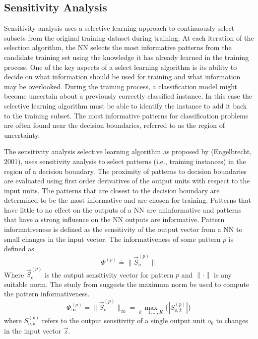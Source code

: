 \documentclass[conference]{IEEEtran}
\begin{document}
	\subsection{Sensitivity Analysis}
	Sensitivity analysis uses a selective learning approach to continuously select subsets from the original training dataset during training. At each iteration of the selection algorithm, the NN selects the most informative patterns from the candidate training set using the knowledge it has already learned in the training process. One of the key aspects of a select learning algorithm is its ability to decide on what information should be used for training and what information may be overlooked. During the training process, a classification model might become uncertain about a previously correctly classified instance. In this case the selective learning algorithm must be able to identify the instance to add it back to the training subset. The most informative patterns for classification problems are often found near the decision boundaries, referred to as the region of uncertainty.
	
	The sensitivity analysis selective learning algorithm as proposed by (Engelbrecht, 2001), uses sensitivity analysis to select patterns (i.e., training instances) in the region of a decision boundary. The proximity of patterns to decision boundaries are evaluated using first order derivatives of the output units with respect to the input units. The patterns that are closest to the decision boundary are determined to be the most informative and are chosen for training. Patterns that have little to no effect on the outputs of a NN are uninformative and patterns that have a strong influence on the NN outputs are informative. Pattern informativeness is defined as the sensitivity of the output vector from a NN to small changes in the input vector. The informativeness of some pattern $p$ is defined as
	$$
	\Phi^{(p)} \doteq \lVert\vec{S}_o^{(p)}\lVert
	$$
	 Where $\vec{S}_o^{(p)}$ is the output sensitivity vector for pattern $p$ and $\lVert\cdot\lVert$ is any suitable norm. 
	The study from \cite{engelbrecht2001} suggests the maximum norm be used to compute the pattern informativeness.
	$$
	\Phi_\infty^{(p)} = \lVert\vec{S}_o^{(p)}\lVert_\infty = \max_{k=1,...,K}\{|S_{o,k}^{(p)}|\}
	$$
	where $S_{o,k}^{(p)}$ refers to the output sensitivity of a single output unit $o_k$ to changes in the input vector $\vec{z}$.
	
\end{document}
